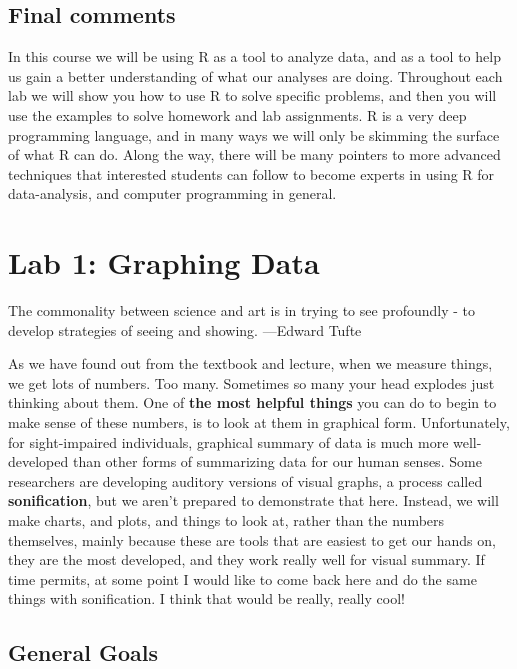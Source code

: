 \documentclass[]{book}
\theoremstyle{definition}
\theoremstyle{definition}
\theoremstyle{definition}
\theoremstyle{remark}
\begin{document}
\section{Final comments}\label{final-comments}

In this course we will be using R as a tool to analyze data, and as a
tool to help us gain a better understanding of what our analyses are
doing. Throughout each lab we will show you how to use R to solve
specific problems, and then you will use the examples to solve homework
and lab assignments. R is a very deep programming language, and in many
ways we will only be skimming the surface of what R can do. Along the
way, there will be many pointers to more advanced techniques that
interested students can follow to become experts in using R for
data-analysis, and computer programming in general.

\chapter{Lab 1: Graphing Data}\label{lab-1-graphing-data}

{ The commonality between science and art is in trying to see profoundly
- to develop strategies of seeing and showing. ---Edward Tufte }

As we have found out from the textbook and lecture, when we measure
things, we get lots of numbers. Too many. Sometimes so many your head
explodes just thinking about them. One of \textbf{the most helpful
things} you can do to begin to make sense of these numbers, is to look
at them in graphical form. Unfortunately, for sight-impaired
individuals, graphical summary of data is much more well-developed than
other forms of summarizing data for our human senses. Some researchers
are developing auditory versions of visual graphs, a process called
\textbf{sonification}, but we aren't prepared to demonstrate that here.
Instead, we will make charts, and plots, and things to look at, rather
than the numbers themselves, mainly because these are tools that are
easiest to get our hands on, they are the most developed, and they work
really well for visual summary. If time permits, at some point I would
like to come back here and do the same things with sonification. I think
that would be really, really cool!

\section{General Goals}\label{general-goals}
\end{document}
